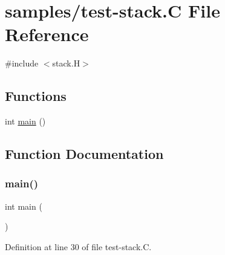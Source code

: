 \hypertarget{test-stack_8_c}{}\section{samples/test-\/stack.C File Reference}
\label{test-stack_8_c}
{\ttfamily \#include $<$stack.\+H$>$}\newline
\subsection*{Functions}
\begin{DoxyCompactItemize}
\item 
int \hyperlink{test-stack_8_c_ae66f6b31b5ad750f1fe042a706a4e3d4}{main} ()
\end{DoxyCompactItemize}


\subsection{Function Documentation}
\mbox{\label{test-stack_8_c_ae66f6b31b5ad750f1fe042a706a4e3d4}} 
\subsubsection{\texorpdfstring{main()}{main()}}
{\footnotesize\ttfamily int main (\begin{DoxyParamCaption}{ }\end{DoxyParamCaption})}



Definition at line 30 of file test-\/stack.\+C.

